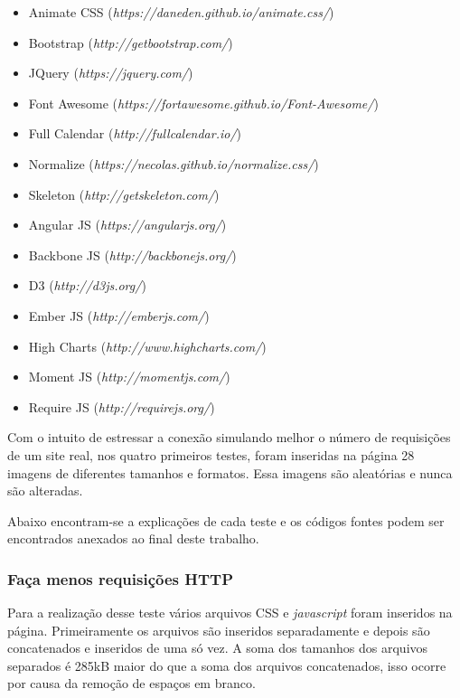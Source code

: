 \begin{itemize}
	\item Animate CSS (\textit{https://daneden.github.io/animate.css/})
	\item Bootstrap (\textit{http://getbootstrap.com/})
	\item JQuery (\textit{https://jquery.com/})
	\item Font Awesome (\textit{https://fortawesome.github.io/Font-Awesome/})
	\item Full Calendar (\textit{http://fullcalendar.io/})
	\item Normalize (\textit{https://necolas.github.io/normalize.css/})
	\item Skeleton (\textit{http://getskeleton.com/})
	\item Angular JS (\textit{https://angularjs.org/})
	\item Backbone JS (\textit{http://backbonejs.org/})
	\item D3 (\textit{http://d3js.org/})
	\item Ember JS (\textit{http://emberjs.com/})
	\item High Charts (\textit{http://www.highcharts.com/})
	\item Moment JS (\textit{http://momentjs.com/})
	\item Require JS (\textit{http://requirejs.org/})
\end{itemize}

Com o intuito de estressar a conexão simulando melhor o número de requisições de um site real, nos quatro primeiros testes, foram inseridas na página 28 imagens de diferentes tamanhos e formatos. Essa imagens são aleatórias e nunca são alteradas.

Abaixo encontram-se a explicações de cada teste e os códigos fontes podem ser encontrados anexados ao final deste trabalho.

\subsubsection{Faça menos requisições HTTP}
\label{facamenosrequisicoeshttp}

Para a realização desse teste vários arquivos CSS e \textit{javascript} foram inseridos na página. Primeiramente os arquivos são inseridos separadamente e depois são concatenados e inseridos de uma só vez. A soma dos tamanhos dos arquivos separados é 285kB maior do que a soma dos arquivos concatenados, isso ocorre por causa da remoção de espaços em branco.

